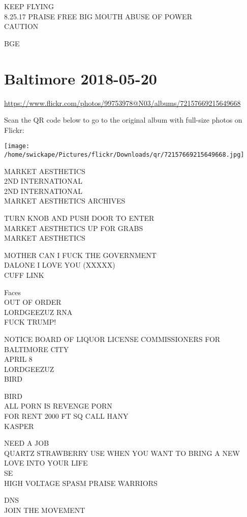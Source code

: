 \documentclass[10pt,letterpaper]{article}
\begin{document}
KEEP FLYING\\
8.25.17 PRAISE FREE BIG MOUTH ABUSE OF POWER\\
CAUTION

BGE
\pagebreak

\section*{Baltimore 2018-05-20}

\url{https://www.flickr.com/photos/99753978@N03/albums/72157669215649668}

Scan the QR code below to go to the original album with full-size photos on Flickr:

\texttt{[image: /home/swickape/Pictures/flickr/Downloads/qr/72157669215649668.jpg]}
\pagebreak

MARKET AESTHETICS\\
2ND INTERNATIONAL\\
2ND INTERNATIONAL\\
MARKET AESTHETICS ARCHIVES

TURN KNOB AND PUSH DOOR TO ENTER\\
MARKET AESTHETICS UP FOR GRABS\\
MARKET AESTHETICS

MOTHER CAN I FUCK THE GOVERNMENT\\
DALONE I LOVE YOU (XXXXX)\\
CUFF LINK

Faces\\
OUT OF ORDER\\
LORDGEEZUZ RNA\\
FUCK TRUMP!

NOTICE BOARD OF LIQUOR LICENSE COMMISSIONERS FOR BALTIMORE CITY\\
APRIL 8\\
LORDGEEZUZ\\
BIRD

BIRD\\
ALL PORN IS REVENGE PORN\\
FOR RENT 2000 FT SQ CALL HANY\\
KASPER

NEED A JOB\\
QUARTZ STRAWBERRY USE WHEN YOU WANT TO BRING A NEW LOVE INTO YOUR LIFE\\
SE\\
HIGH VOLTAGE SPASM PRAISE WARRIORS

DNS\\
JOIN THE MOVEMENT
\end{document}
